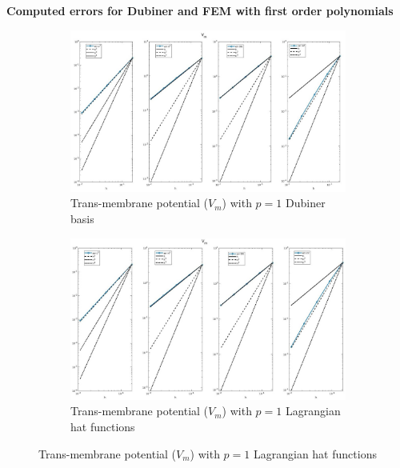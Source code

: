 \documentclass[a4paper,11pt]{article}
\begin{document}
\newpage
{}
\begin{center}
\textbf{Computed errors for Dubiner and FEM with first order polynomials}
\end{center}

\begin{figure}[H]
\caption{Comparison of the trans-membrane potential ($V_m$)}
\label{Vm_1}
\begin{subfigure}{\textwidth}
\begin{center}
\includegraphics[width = \textwidth]{./D1_Vm_1.jpg}
\caption{Trans-membrane potential ($V_m$) with $p=1$ Dubiner basis}
\end{center}
\end{subfigure}
\begin{subfigure}{\textwidth}
\begin{center}
\includegraphics[width =\textwidth]{./P1_Vm_1.jpg}
\caption{Trans-membrane potential ($V_m$) with $p=1$ Lagrangian hat functions}
\end{center}
\end{subfigure}
\end{figure}
\end{document}
